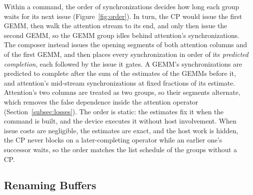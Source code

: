 Within a command, the order of synchronizations decides how long each group waits for its next issue (Figure~\ref{fig:order}).
In turn, the CP would issue the first GEMM, then walk the attention stream to its end, and only then issue the second GEMM, so the GEMM group idles behind attention's synchronizations.
The composer instead issues the opening segments of both attention columns and of the first GEMM, and then places every synchronization in order of its \emph{predicted completion}, each followed by the issue it gates.
A GEMM's synchronizations are predicted to complete after the sum of the estimates of the GEMMs before it, and attention's mid-stream synchronizations at fixed fractions of its estimate.
Attention's two columns are treated as two groups, so their segments alternate, which removes the false dependence inside the attention operator (Section~\ref{subsec:losses}).
The order is static: the estimates fix it when the command is built, and the device executes it without host involvement.
When issue costs are negligible, the estimates are exact, and the host work is hidden, the CP never blocks on a later-completing operator while an earlier one's successor waits, so the order matches the list schedule of the groups without a CP.

\subsection{Renaming Buffers}
\label{subsec:rings}

